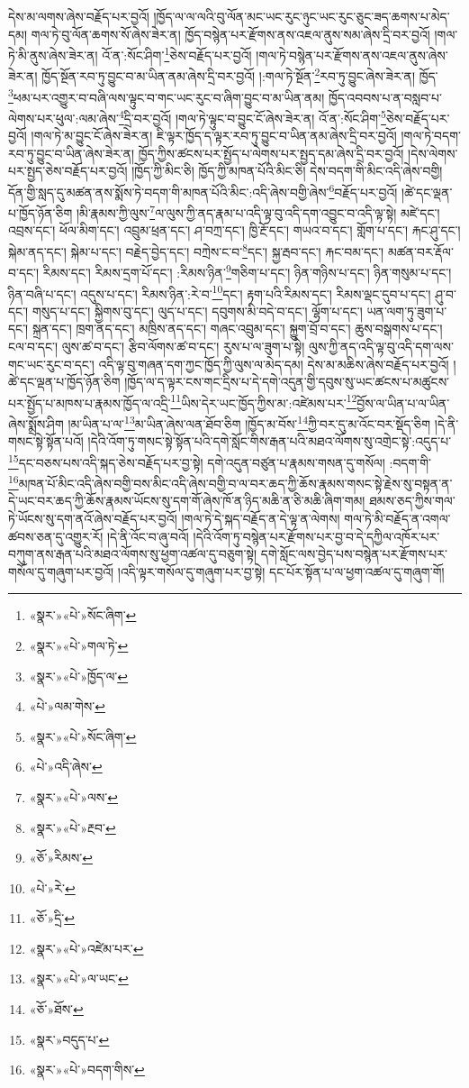 དེས་མ་ལགས་ཞེས་བརྗོད་པར་བྱའོ། །ཁྱོད་ལ་ལ་ལའི་བུ་ལོན་མང་ཡང་རུང་ཉུང་ཡང་རུང་ཅུང་ཟད་ཆགས་པ་མེད་དམ། གལ་ཏེ་བུ་ལོན་ཆགས་སོ་ཞེས་ཟེར་ན། ཁྱོད་བསྙེན་པར་རྫོགས་ནས་འཇལ་ནུས་སམ་ཞེས་དྲི་བར་བྱའོ། །གལ་ཏེ་མི་ནུས་ཞེས་ཟེར་ན། འོ་ན་:སོང་ཤིག་\footnote{«སྣར་»«པེ་»སོང་ཞིག་}ཅེས་བརྗོད་པར་བྱའོ། །གལ་ཏེ་བསྙེན་པར་རྫོགས་ནས་འཇལ་ནུས་ཞེས་ཟེར་ན། ཁྱོད་སྔོན་རབ་ཏུ་བྱུང་བ་མ་ཡིན་ནམ་ཞེས་དྲི་བར་བྱའོ། །:གལ་ཏེ་སྔོན་\footnote{«སྣར་»«པེ་»གལ་ཏེ་}རབ་ཏུ་བྱུང་ཞེས་ཟེར་ན། ཁྱོད་\footnote{«སྣར་»«པེ་»ཁྱོད་ལ་}ཕམ་པར་འགྱུར་བ་བཞི་ལས་ལྟུང་བ་གང་ཡང་རུང་བ་ཞིག་བྱུང་བ་མ་ཡིན་ནམ། ཁྱོད་འབབས་པ་ན་བསླབ་པ་ལེགས་པར་ཕུལ་:ལམ་ཞེས་\footnote{«པེ་»ལམ་གེས་}དྲི་བར་བྱའོ། །གལ་ཏེ་ལྟུང་བ་བྱུང་ངོ་ཞེས་ཟེར་ན། འོ་ན་:སོང་ཤིག་\footnote{«སྣར་»«པེ་»སོང་ཞིག་}ཅེས་བརྗོད་པར་བྱའོ། །གལ་ཏེ་མ་བྱུང་ངོ་ཞེས་ཟེར་ན། ཇི་ལྟར་ཁྱོད་ད་ལྟར་རབ་ཏུ་བྱུང་བ་ཡིན་ནམ་ཞེས་དྲི་བར་བྱའོ། །གལ་ཏེ་བདག་རབ་ཏུ་བྱུང་བ་ཡིན་ཞེས་ཟེར་ན། ཁྱོད་ཀྱིས་ཚངས་པར་སྤྱོད་པ་ལེགས་པར་སྤྱད་དམ་ཞེས་དྲི་བར་བྱའོ། །དེས་ལེགས་པར་སྤྱད་ཅེས་བརྗོད་པར་བྱའོ། །ཁྱོད་ཀྱི་མིང་ཅི། ཁྱོད་ཀྱི་མཁན་པོའི་མིང་ཅི། དེས་བདག་གི་མིང་འདི་ཞེས་བགྱི། དོན་གྱི་སླད་དུ་མཚན་ནས་སྨོས་ཏེ་བདག་གི་མཁན་པོའི་མིང་:འདི་ཞེས་བགྱི་ཞེས་\footnote{«པེ་»འདི་ཞེས་}བརྗོད་པར་བྱའོ། །ཚེ་དང་ལྡན་པ་ཁྱོད་ཉོན་ཅིག །མི་རྣམས་ཀྱི་ལུས་\footnote{«སྣར་»«པེ་»ལས་}ལ་ལུས་ཀྱི་ནད་རྣམ་པ་འདི་ལྟ་བུ་འདི་དག་འབྱུང་བ་འདི་ལྟ་སྟེ། མཛེ་དང་། འབྲས་དང་། ཕོལ་མིག་དང་། འབྲུམ་ཕྲན་དང་། ཤ་བཀྲ་དང་། ཁྱི་རྔོ་དང་། གཡའ་བ་དང་། གློག་པ་དང་། རྐང་ཤུ་དང་། སྐེམ་ནད་དང་། སྐེམ་པ་དང་། བརྗེད་བྱེད་དང་། བཀྲེས་ང་བ་\footnote{«སྣར་»«པེ་»རྔབ་}དང་། སྐྱ་རྦབ་དང་། རྐང་བམ་དང་། མཚན་བར་རྡོལ་བ་དང་། རིམས་དང་། རིམས་དྲག་པོ་དང་། :རིམས་ཉིན་\footnote{«ཅོ་»རིམས་}གཅིག་པ་དང་། ཉིན་གཉིས་པ་དང་། ཉིན་གསུམ་པ་དང་། ཉིན་བཞི་པ་དང་། འདུས་པ་དང་། རིམས་ཉིན་:རེ་བ་\footnote{«པེ་»རེ་}དང་། རྟག་པའི་རིམས་དང་། རིམས་ལྡང་དུབ་པ་དང་། ཤུ་བ་དང་། གསུད་པ་དང་། སྐྱིགས་བུ་དང་། ལུད་པ་དང་། དབུགས་མི་བདེ་བ་དང་། ལྷོག་པ་དང་། ཡན་ལག་ཏུ་ཟུག་པ་དང་། སྐྲན་དང་། ཁྲག་ནད་དང་། མཁྲིས་ནད་དང་། གཞང་འབྲུམ་དང་། སྐྱུག་བྲོ་བ་དང་། ཆུས་བསྒགས་པ་དང་། ངལ་བ་དང་། ལུས་ཚ་བ་དང་། རྩིབ་ལོགས་ཚ་བ་དང་། རུས་པ་ལ་ཟུག་པ་སྟེ། ལུས་ཀྱི་ནད་འདི་ལྟ་བུ་འདི་དག་ལས་གང་ཡང་རུང་བ་དང་། འདི་ལྟ་བུ་གཞན་དག་ཀྱང་ཁྱོད་ཀྱི་ལུས་ལ་མེད་དམ། དེས་མ་མཆིས་ཞེས་བརྗོད་པར་བྱའོ། །ཚེ་དང་ལྡན་པ་ཁྱོད་ཉོན་ཅིག །ཁྱོད་ལ་ད་ལྟར་ངས་གང་དྲིས་པ་དེ་དགེ་འདུན་གྱི་དབུས་སུ་ཡང་ཚངས་པ་མཚུངས་པར་སྤྱོད་པ་མཁས་པ་རྣམས་ཁྱོད་ལ་འདྲི་\footnote{«ཅོ་»དྲི་}ཡིས་དེར་ཡང་ཁྱོད་ཀྱིས་མ་:འཛེམས་པར་\footnote{«སྣར་»«པེ་»འཛེམ་པར་}བྱོས་ལ་ཡིན་པ་ལ་ཡིན་ཞེས་སྨྲོས་ཤིག །མ་ཡིན་པ་ལ་\footnote{«སྣར་»«པེ་»ལ་ཡང་}མ་ཡིན་ཞེས་ལན་ཐོབ་ཅིག །ཁྱོད་མ་བོས་\footnote{«ཅོ་»ཐོས་}ཀྱི་བར་དུ་མ་འོང་བར་སྡོད་ཅིག །དེ་ནི་གསང་སྟེ་སྟོན་པའོ། །དེའི་འོག་ཏུ་གསང་སྟེ་སྟོན་པའི་དགེ་སློང་གིས་རྒན་པའི་མཐའ་ལོགས་སུ་འགྲེང་སྟེ་:འདུད་པ་\footnote{«སྣར་»བདུད་པ་}དང་བཅས་པས་འདི་སྐད་ཅེས་བརྗོད་པར་བྱ་སྟེ། དགེ་འདུན་བཙུན་པ་རྣམས་གསན་དུ་གསོལ། :བདག་གི་\footnote{«སྣར་»«པེ་»བདག་གིས་}མཁན་པོ་མིང་འདི་ཞེས་བགྱི་བས་མིང་འདི་ཞེས་བགྱི་བ་ལ་བར་ཆད་ཀྱི་ཆོས་རྣམས་གསང་སྟེ་རྗེས་སུ་བསྟན་ན་དེ་ཡང་བར་ཆད་ཀྱི་ཆོས་རྣམས་ཡོངས་སུ་དག་གོ་ཞེས་ཁོ་ན་ཉིད་མཆི་ན་ཅི་མཆི་ཞིག་གམ། ཐམས་ཅད་ཀྱིས་གལ་ཏེ་ཡོངས་སུ་དག་ནའོ་ཞེས་བརྗོད་པར་བྱའོ། །གལ་ཏེ་དེ་སྐད་བརྗོད་ན་དེ་ལྟ་ན་ལེགས། གལ་ཏེ་མི་བརྗོད་ན་འགལ་ཚབས་ཅན་དུ་འགྱུར་རོ། །དེ་ནི་འོང་བ་ཞུ་བའོ། །དེའི་འོག་ཏུ་བསྙེན་པར་རྫོགས་པར་བྱ་བ་དེ་དཀྱིལ་འཁོར་པར་བཀུག་ནས་རྒན་པའི་མཐའ་ལོགས་སུ་ཕྱག་འཚལ་དུ་བཅུག་སྟེ། དགེ་སློང་ལས་བྱེད་པས་བསྙེན་པར་རྫོགས་པར་གསོལ་དུ་གཞུག་པར་བྱའོ། །འདི་ལྟར་གསོལ་དུ་གཞུག་པར་བྱ་སྟེ། དང་པོར་སྟོན་པ་ལ་ཕྱག་འཚལ་དུ་གཞུག་གོ། 